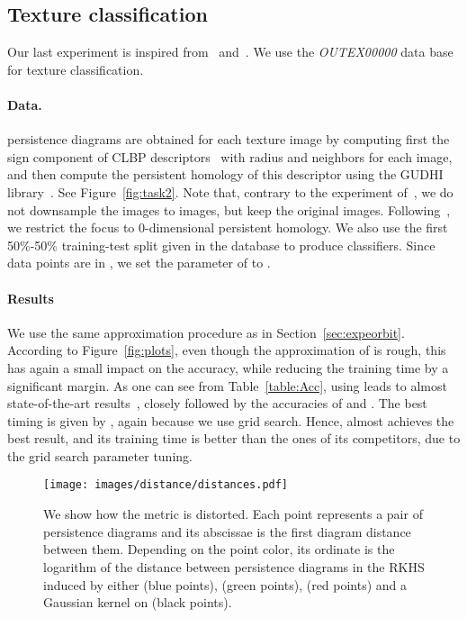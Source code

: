 \documentclass[11pt]{article}
\begin{document}
\subsection{Texture classification}

Our last experiment is inspired from~\cite{Reininghaus15} and~\cite{Li14}. 
We use the \emph{OUTEX00000} data base~\cite{Ojala02} for texture classification. 

\paragraph*{Data.} persistence diagrams are obtained for each texture image by computing first the sign component of CLBP descriptors~\cite{Guo10} 
with radius  and  neighbors for each image,
and then compute the persistent homology of this descriptor using the GUDHI library~\cite{gudhi}. 
See Figure~\ref{fig:task2}.
Note that, contrary to the experiment of~\cite{Reininghaus15}, we do not downsample the images to  images,
but keep the original  images. 
Following~\cite{Reininghaus15}, we restrict the focus to 0-dimensional persistent homology.
We also use the first 50\%-50\% training-test split given in the database to produce classifiers. 
Since data points are in , we set the  parameter of  to . 

\paragraph*{Results} We use the same approximation procedure as in Section~\ref{sec:expeorbit}.
According to Figure~\ref{fig:plots}, even though the approximation of  is rough,
this has again a small impact on the accuracy, while reducing the training time by a significant margin.
As one can see from Table~\ref{table:Acc}, 
using  leads to almost state-of-the-art results~\cite{Ojala02, Guo10},
closely followed by the accuracies of  and .
The best timing is given by , again because we use grid search. 
Hence,  almost achieves the best result, and its training time is
better than the ones of its competitors, due to the grid search parameter tuning.






\begin{figure}\centering
\texttt{[image: images/distance/distances.pdf]}
\caption{\label{fig:Airplanedistances} We show how the metric  is distorted.
Each point represents a pair of persistence diagrams and its abscissae is the first diagram distance between them. 
Depending on the point color, its ordinate is the logarithm of the distance between persistence diagrams in the RKHS induced by either
 (blue points),  (green points),  (red points) and a Gaussian kernel on  (black points).  }
\end{figure}
\end{document}
